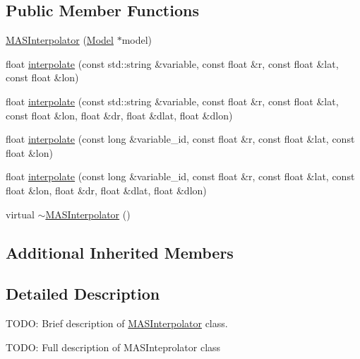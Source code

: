 \subsection*{Public Member Functions}
\begin{DoxyCompactItemize}
\item 
\hyperlink{classccmc_1_1_m_a_s_interpolator_a987275f76e2bfae78ee770955c92d2eb}{M\-A\-S\-Interpolator} (\hyperlink{classccmc_1_1_model}{Model} $\ast$model)
\item 
float \hyperlink{classccmc_1_1_m_a_s_interpolator_a7b90e851333829c8fe49f03737dd60d5}{interpolate} (const std\-::string \&variable, const float \&r, const float \&lat, const float \&lon)
\item 
float \hyperlink{classccmc_1_1_m_a_s_interpolator_ad3031df0390ce4e955c40560ee3f6752}{interpolate} (const std\-::string \&variable, const float \&r, const float \&lat, const float \&lon, float \&dr, float \&dlat, float \&dlon)
\item 
float \hyperlink{classccmc_1_1_m_a_s_interpolator_a8b07ceb8c0a34422e7b9933873bafcb3}{interpolate} (const long \&variable\-\_\-id, const float \&r, const float \&lat, const float \&lon)
\item 
float \hyperlink{classccmc_1_1_m_a_s_interpolator_ab4015bfd559e1eac116ef1772be91b03}{interpolate} (const long \&variable\-\_\-id, const float \&r, const float \&lat, const float \&lon, float \&dr, float \&dlat, float \&dlon)
\item 
virtual \hyperlink{classccmc_1_1_m_a_s_interpolator_ae18b0ac3b7117f9c4b630b505e7385cd}{$\sim$\-M\-A\-S\-Interpolator} ()
\end{DoxyCompactItemize}
\subsection*{Additional Inherited Members}


\subsection{Detailed Description}
T\-O\-D\-O\-: Brief description of \hyperlink{classccmc_1_1_m_a_s_interpolator}{M\-A\-S\-Interpolator} class. 

T\-O\-D\-O\-: Full description of M\-A\-S\-Inteprolator class 

